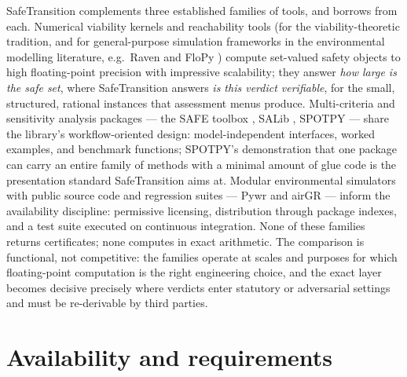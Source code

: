 \documentclass[3p,11pt]{elsarticle}
\begin{document}
SafeTransition complements three established families of tools, and borrows
from each. Numerical viability kernels and reachability tools (for the
viability-theoretic tradition, and for general-purpose simulation frameworks
in the environmental modelling literature, e.g.\ Raven
\citep{Craig2020} and FloPy \citep{Bakker2016}) compute set-valued safety
objects to high floating-point precision with impressive scalability; they
answer \emph{how large is the safe set}, where SafeTransition answers
\emph{is this verdict verifiable}, for the small, structured, rational
instances that assessment menus produce. Multi-criteria and sensitivity
analysis packages --- the SAFE toolbox \citep{Pianosi2015}, SALib
\citep{Herman2017}, SPOTPY \citep{Houska2015} --- share the library's
workflow-oriented design: model-independent interfaces, worked examples,
and benchmark functions; SPOTPY's demonstration that one package can carry
an entire family of methods with a minimal amount of glue code is the
presentation standard SafeTransition aims at. Modular environmental
simulators with public source code and regression suites --- Pywr
\citep{Tomlinson2020} and airGR \citep{Coron2017} --- inform the
availability discipline: permissive licensing, distribution through package
indexes, and a test suite executed on continuous integration. None of these
families returns certificates; none computes in exact arithmetic. The
comparison is functional, not competitive: the families operate at scales
and purposes for which floating-point computation is the right engineering
choice, and the exact layer becomes decisive precisely where verdicts enter
statutory or adversarial settings and must be re-derivable by third parties.

\section{Availability and requirements}\label{sec:availability}
\end{document}
